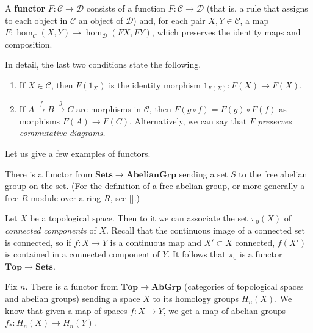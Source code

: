 \begin{definition}
A \textbf{functor} $F: \mathcal{C} \to \mathcal{D}$ consists of a function $F:
\mathcal{C} \to  \mathcal{D}$ (that is, a rule that assigns to each object
in $\mathcal{C}$ an object of $\mathcal{D}$) and, for each pair $X, Y \in
\mathcal{C}$,
a map
$F: \hom_{\mathcal{C}}(X, Y) \to \hom_{\mathcal{D}}(FX, FY)$, which preserves
the identity
maps and composition.

In detail, the last two conditions state the following. 
\begin{enumerate}
\item  If $X \in
\mathcal{C}$, then $F(1_X)$ is the identity morphism $1_{F(X)}: F(X) \to
F(X)$.
\item  If $A \stackrel{f}{\to} B \stackrel{g}{\to} C$ are
morphisms in $\mathcal{C}$,
then $F(g \circ f) = F(g) \circ F(f)$ as morphisms $F(A) \to F(C)$.
Alternatively, we can say that $F$ \emph{preserves commutative diagrams.}
\end{enumerate}
\end{definition}

Let us give a few examples of functors.

\begin{example}
There is a functor from $\mathbf{Sets} \to \mathbf{AbelianGrp}$ sending a set
$S$ to the free abelian group on the set. (For the definition of a free abelian
group, or more generally a free $R$-module over a ring $R$, see \cref{}.)
\end{example}

\begin{example} 
Let $X$ be a topological space. Then to it we can associate the set $\pi_0(X)$
of \emph{connected components} of $X$. Recall that the continuous image of a
connected set is connected, so if $f: X \to Y$ is a continuous map and $X'
\subset X$ connected, $f(X')$ is contained in a connected component of $Y$. It
follows that $\pi_0$ is a functor $\mathbf{Top} \to \mathbf{Sets}$.
\end{example} 


\begin{example}
Fix $n$.
There is a functor from $\mathbf{Top} \to \mathbf{AbGrp}$
(categories of topological spaces and abelian groups) sending a
space $X$ to its homology groups $H_n(X)$. We know that given a map of spaces
$f: X \to Y$,
we get a map of abelian groups $f_*: H_n(X) \to H_n(Y)$.
\end{example}

